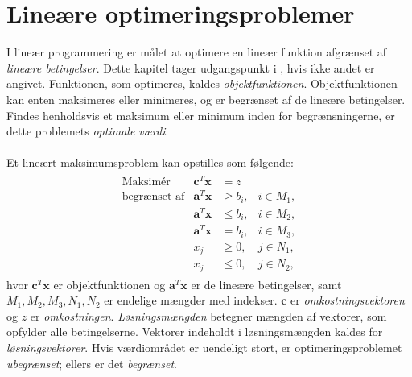 \chapter{Lineære optimeringsproblemer}
%
I lineær programmering er målet at optimere en lineær funktion afgrænset af \textit{lineære betingelser}.
Dette kapitel tager udgangspunkt i \citep[side 2-6, 21-24 og 139-146]{bert}, hvis ikke andet er angivet.
Funktionen, som optimeres, kaldes \textit{objektfunktionen}.
Objektfunktionen kan enten maksimeres eller minimeres, og er begrænset af de lineære betingelser.
Findes henholdsvis et maksimum eller minimum inden for begrænsningerne, er dette problemets \textit{optimale værdi}.
\\\\
%
Et lineært maksimumsproblem kan opstilles som følgende:
%
\begin{align*}
\begin{array}{lrll}
\text{Maksimér}		&\textbf{c}^T\textbf{x}	& = z		&\\
\text{begrænset af}	&\textbf{a}^T\textbf{x}	&\geq b_i,	&i \in M_1,\\
					&\textbf{a}^T\textbf{x}	&\leq b_i,	&i \in M_2,\\
					&\textbf{a}^T\textbf{x}	& = b_i,	&i \in M_3,\\
					&x_j					&\geq 0,	&j \in N_1,\\
					&x_j					&\leq 0,	&j \in N_2,
\end{array}
\end{align*}
%
hvor $\textbf{c}^T\textbf{x}$ er objektfunktionen og $\textbf{a}^T\textbf{x}$ er de lineære betingelser, samt $M_1, M_2, M_3, N_1, N_2$ er endelige mængder med indekser.
$\textbf{c}$ er \textit{omkostningsvektoren} og $z$ er \textit{omkostningen}.
\textit{Løsningsmængden} betegner mængden af vektorer, som opfylder alle betingelserne.
Vektorer indeholdt i løsningsmængden kaldes for \textit{løsningsvektorer}.
Hvis værdiområdet er uendeligt stort, er optimeringsproblemet \textit{ubegrænset}; ellers er det \textit{begrænset}. 
\\\\
%
